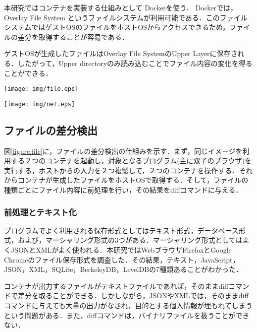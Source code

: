 \documentclass[submit,techrep]{ipsj}
\begin{document}
本研究ではコンテナを実装する仕組みとして Dockerを使う． Dockerでは， Overlay File System というファイルシステムが利用可能である．このファイルシステムではゲストOSのファイルをホストOSからアクセスできるため，ファイルの差分を取得することが容易である．

ゲストOSが生成したファイルはOverlay File SystemのUpper Layerに保存される．したがって，Upper directoryのみ読み込むことでファイル内容の変化を得ることができる．




\begin{figure*}[ht]
\begin{center}
\texttt{[image: img/file.eps]}
\caption{Docker Overlay Filesystemによるファイル差分検出}
\label{figure:file}
\end{center}
\end{figure*}

\begin{figure*}[ht]
\begin{center}
\texttt{[image: img/net.eps]}
\caption{MITM-proxyを用いたHTTPのメッセージの差分検出}
\label{figure:network}
\end{center}
\end{figure*}


\subsection{ファイルの差分検出}
\label{cha:file}

図\ref{figure:file}に，ファイルの差分検出の仕組みを示す．まず，同じイメージを利用する２つのコンテナを起動し，対象となるプログラム(主に双子のブラウザ)を実行する，ホストからの入力を２つ複製して，２つのコンテナを操作する．それからコンテナが生成したファイルをホストOSで取得する．そして，ファイルの種類ごとにファイル内容に前処理を行い，その結果をdiffコマンドに与える．

\subsubsection{前処理とテキスト化}
\label{sec:prep}
プログラムでよく利用される保存形式としてはテキスト形式，データベース形式，および，マーシャリング形式の3つがある．マーシャリング形式としてはよくJSONとXMLがよく使われる．本研究ではWebブラウザFirefoxとGoogle Chromeのファイル保存形式を調査した．その結果，テキスト，JavaScript，JSON，XML，SQLite，BerkeleyDB，LevelDBの7種類あることがわかった．

コンテナが出力するファイルがテキストファイルであれば，そのままdiffコマンドで差分を取ることができる．しかしながら，JSONやXMLでは，そのままdiffコマンドに与えても大量の出力がなされ，目的とする個人情報が埋もれてしまうという問題がある．また，diffコマンドは，バイナリファイルを扱うことができない．
\end{document}
